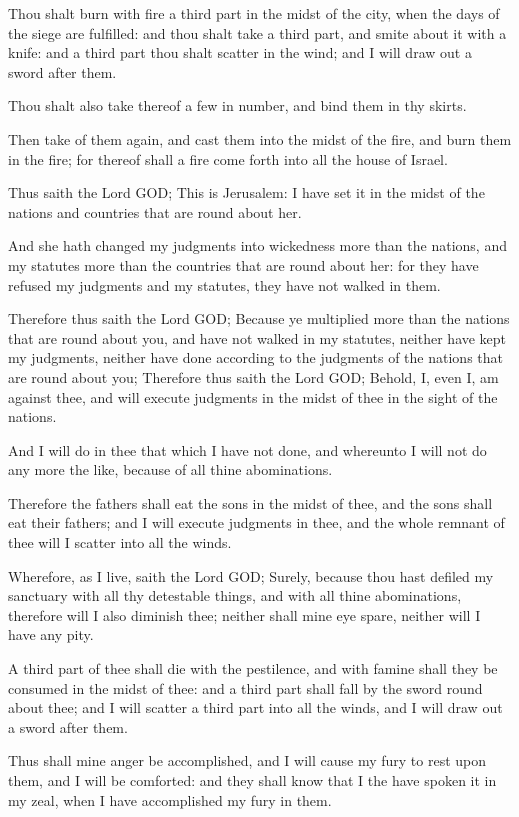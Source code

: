 \Verse Thou shalt burn with fire a third part in the midst of the city, when the days of the siege are fulfilled: and thou shalt take a third part, and smite about it with a knife: and a third part thou shalt scatter in the wind; and I will draw out a sword after them.

\Verse Thou shalt also take thereof a few in number, and bind them in thy skirts.

\Verse Then take of them again, and cast them into the midst of the fire, and burn them in the fire; for thereof shall a fire come forth into all the house of Israel.

\Verse Thus saith the Lord GOD; This is Jerusalem: I have set it in the midst of the nations and countries that are round about her.

\Verse And she hath changed my judgments into wickedness more than the nations, and my statutes more than the countries that are round about her: for they have refused my judgments and my statutes, they have not walked in them.

\Verse Therefore thus saith the Lord GOD; Because ye multiplied more than the nations that are round about you, and have not walked in my statutes, neither have kept my judgments, neither have done according to the judgments of the nations that are round about you; \Verse Therefore thus saith the Lord GOD; Behold, I, even I, am against thee, and will execute judgments in the midst of thee in the sight of the nations.

\Verse And I will do in thee that which I have not done, and whereunto I will not do any more the like, because of all thine abominations.

\Verse Therefore the fathers shall eat the sons in the midst of thee, and the sons shall eat their fathers; and I will execute judgments in thee, and the whole remnant of thee will I scatter into all the winds.

\Verse Wherefore, as I live, saith the Lord GOD; Surely, because thou hast defiled my sanctuary with all thy detestable things, and with all thine abominations, therefore will I also diminish thee; neither shall mine eye spare, neither will I have any pity.

\Verse A third part of thee shall die with the pestilence, and with famine shall they be consumed in the midst of thee: and a third part shall fall by the sword round about thee; and I will scatter a third part into all the winds, and I will draw out a sword after them.

\Verse Thus shall mine anger be accomplished, and I will cause my fury to rest upon them, and I will be comforted: and they shall know that I the \LORD have spoken it in my zeal, when I have accomplished my fury in them.

